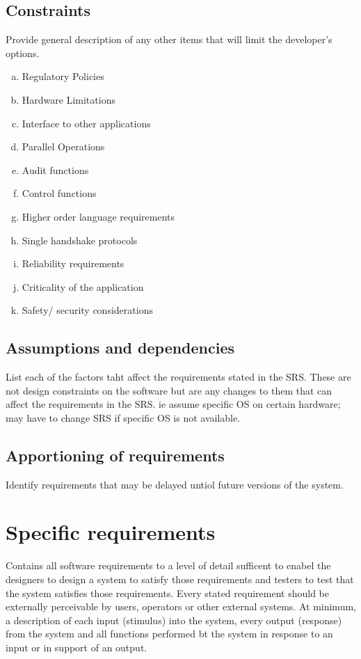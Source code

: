 \documentclass[10pt]{article}
\begin{document}
     \subsection{Constraints}
     Provide general description of any other items that will limit the developer's options.
     
     \begin{enumerate}[(a)]
     \item{Regulatory Policies}
     \item{Hardware Limitations}
     \item{Interface to other applications}
     \item{Parallel Operations}
     \item{Audit functions}
     \item{Control functions}
     \item{Higher order language requirements}
     \item{Single handshake protocols}
     \item{Reliability requirements}
     \item{Criticality of the application}
     \item{Safety/ security considerations}
     \end{enumerate}

     \subsection{Assumptions and dependencies}
     List each of the factors taht affect the requirements stated in the SRS. These are not design constraints on the software but are any changes to them that can affect the requirements in the SRS. ie assume specific OS on certain hardware; may have to change SRS if specific OS is not available.

     \subsection{Apportioning of requirements}
     Identify requirements that may be delayed untiol future versions of the system.
     
\section{Specific requirements}
Contains all software requirements to a level of detail sufficent to enabel the designers to design a system to satisfy those requirements and testers to test that the system satisfies those requirements. Every stated requirement should be externally perceivable by users, operators or other external systems. At minimum, a description of each input (stimulus) into the system, every output (response) from the system and all functions performed bt the system in response to an input or in support of an output. 
\end{document}

